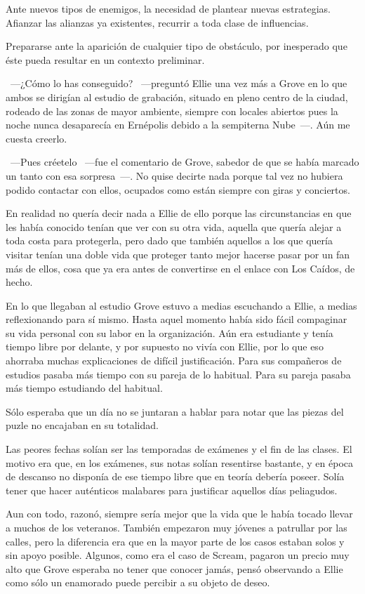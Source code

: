 Ante nuevos tipos de enemigos, la necesidad de plantear nuevas estrategias. Afianzar las alianzas ya existentes, recurrir a toda clase de influencias.

Prepararse ante la aparición de cualquier tipo de obstáculo, por inesperado que éste pueda resultar en un contexto preliminar.

\fancyparbreak
~---¿Cómo lo has conseguido? ~---preguntó Ellie una vez más a Grove en lo que ambos se dirigían al estudio de grabación, situado en pleno centro de la ciudad, rodeado de las zonas de mayor ambiente, siempre con locales abiertos pues la noche nunca desaparecía en Ernépolis debido a la sempiterna Nube~---. Aún me cuesta creerlo.

~---Pues créetelo ~---fue el comentario de Grove, sabedor de que se había marcado un tanto con esa sorpresa~---. No quise decirte nada porque tal vez no hubiera podido contactar con ellos, ocupados como están siempre con giras y conciertos.

En realidad no quería decir nada a Ellie de ello porque las circunstancias en que les había conocido tenían que ver con su otra vida, aquella que quería alejar a toda costa para protegerla, pero dado que también aquellos a los que quería visitar tenían una doble vida que proteger tanto mejor hacerse pasar por un fan más de ellos, cosa que ya era antes de convertirse en el enlace con Los Caídos, de hecho.

En lo que llegaban al estudio Grove estuvo a medias escuchando a Ellie, a medias reflexionando para sí mismo. Hasta aquel momento había sido fácil compaginar su vida personal con su labor en la organización. Aún era estudiante y tenía tiempo libre por delante, y por supuesto no vivía con Ellie, por lo que eso ahorraba muchas explicaciones de difícil justificación. Para sus compañeros de estudios pasaba más tiempo con su pareja de lo habitual. Para su pareja pasaba más tiempo estudiando del habitual.

Sólo esperaba que un día no se juntaran a hablar para notar que las piezas del puzle no encajaban en su totalidad.

Las peores fechas solían ser las temporadas de exámenes y el fin de las clases. El motivo era que, en los exámenes, sus notas solían resentirse bastante, y en época de descanso no disponía de ese tiempo libre que en teoría debería poseer. Solía tener que hacer auténticos malabares para justificar aquellos días peliagudos.

Aun con todo, razonó, siempre sería mejor que la vida que le había tocado llevar a muchos de los veteranos. También empezaron muy jóvenes a patrullar por las calles, pero la diferencia era que en la mayor parte de los casos estaban solos y sin apoyo posible. Algunos, como era el caso de Scream, pagaron un precio muy alto que Grove esperaba no tener que conocer jamás, pensó observando a Ellie como sólo un enamorado puede percibir a su objeto de deseo.


